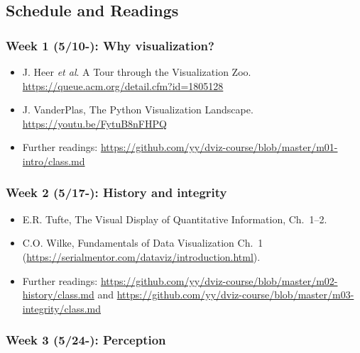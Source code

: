 \subsection{Schedule and Readings}\label{sub:schedule}%

\subsubsection{Week 1 (5/10-): Why visualization?} %

\begin{itemize}\itemsep0em 
\item J. Heer \emph{et al}. A Tour through the Visualization Zoo. \url{https://queue.acm.org/detail.cfm?id=1805128}
\item J. VanderPlas, The Python Visualization Landscape. \url{https://youtu.be/FytuB8nFHPQ}
\item Further readings: \url{https://github.com/yy/dviz-course/blob/master/m01-intro/class.md}
\end{itemize}	

\subsubsection{Week 2 (5/17-): History and integrity}%

\begin{itemize}\itemsep0em 
\item E.R. Tufte, The Visual Display of Quantitative Information, Ch.~1--2.
\item C.O. Wilke, Fundamentals of Data Visualization Ch.~1 (\url{https://serialmentor.com/dataviz/introduction.html}). 
\item Further readings: \url{https://github.com/yy/dviz-course/blob/master/m02-history/class.md} and \url{https://github.com/yy/dviz-course/blob/master/m03-integrity/class.md}
\end{itemize}	


\subsubsection{Week 3 (5/24-): Perception}%

